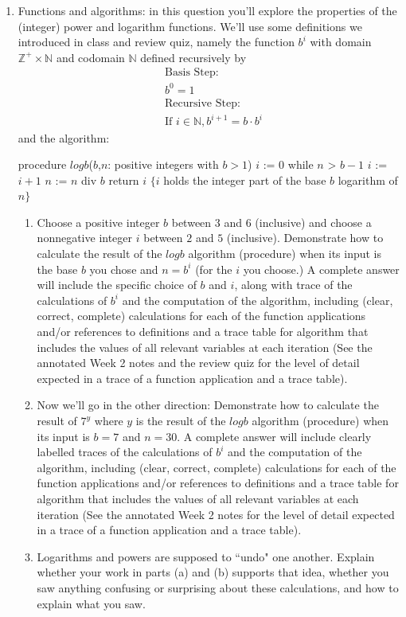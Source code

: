 \documentclass[12pt, oneside]{article}
\begin{document}
\begin{enumerate}[labelindent=0pt, leftmargin=0pt]
\item Functions and algorithms: in this question you'll explore the properties of the (integer) power and logarithm
functions. We'll use some definitions we introduced in class and review quiz, namely the function
$b^i$ with domain $\mathbb{Z}^+ \times \mathbb{N}$ and codomain $\mathbb{N}$ defined recursively by
\begin{align*}    
&\textrm{Basis Step:} \\
&b^0 = 1 \\
&\textrm{Recursive Step:}\\
&\textrm{If } i \in \mathbb{N}, b^{i+1} = b \cdot b^i
\end{align*}
and the algorithm:


\begin{algorithm}[caption={Calculating integer part of base $b$ logarithm}]
   procedure $logb$($b$,$n$: positive integers with $b > 1$)
   $i$ := $0$
   while $n$ > $b-1$
     $i$ := $i + 1$
     $n$ := $n$ div $b$
   return $i$ $\{ i$ holds the integer part of the base $b$ logarithm of $n\}$
\end{algorithm} 

    \begin{enumerate}
    \item Choose a positive integer $b$ between $3$ and $6$ (inclusive) and choose a 
    nonnegative integer $i$ between $2$ and $5$ (inclusive). Demonstrate how to calculate 
    the result of the $logb$ algorithm (procedure) when its input is the base $b$ you chose and
    $n = b^i$ (for the $i$ you choose.) 
    A complete answer will include the specific choice of $b$ and $i$, along with 
    trace of the calculations of $b^i$ and the computation of the algorithm, including 
    (clear, correct, complete) calculations for each of the function applications 
    and/or references to definitions and a trace table for algorithm that includes the values of all relevant 
    variables at each iteration (See the annotated Week 2 notes and the review quiz for the level of detail expected
    in a trace of a function application and a trace table).
    \item Now we'll go in the other direction: Demonstrate how to calculate the result of 
    $7^y$ where $y$ is the result of the $logb$ algorithm (procedure) when its input is $b=7$ and $n=30$.
    A complete answer will include clearly labelled 
    traces of the calculations of $b^i$ and the computation of the algorithm, including 
    (clear, correct, complete) calculations for each of the function applications 
    and/or references to definitions and a trace table for algorithm that includes the values of all relevant 
    variables at each iteration (See the annotated Week 2 notes for the level of detail expected
    in a trace of a function application and a trace table).    
    \item Logarithms and powers are supposed to ``undo" one another. Explain whether your work in parts (a) and (b)
    supports that idea,  whether you saw anything confusing or surprising about these calculations, and how to explain what you saw.
    \end{enumerate}


\end{enumerate}
\end{document}
